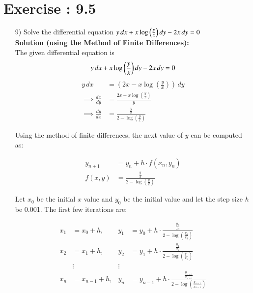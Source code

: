 \documentclass[journal]{IEEEtran}
\begin{document}
\section*{Exercise : 9.5}
\begin{enumerate}
\item [9)] Solve the differential equation $y \, dx + x \log{\ensuremath{\left(\frac{y}{x}\right)}} \, dy - 2x \, dy = 0$ \\
\textbf{Solution (using the Method of Finite Differences):}\\
The given differential equation is 
\begin{align}
    y \, dx + x \log{\ensuremath{\left(\frac{y}{x}\right)}} \, dy - 2x \, dy = 0
\end{align}
\begin{align}
y \, dx &= \left(2x - x \log\left(\frac{y}{x}\right)\right) \, dy \\
\implies \frac{dx}{dy} &= \frac{2x - x \log\left(\frac{y}{x}\right)}{y} \\
\implies \frac{dy}{dx} &= \frac{\frac{y}{x}}{2 - \log\left(\frac{y}{x}\right)} 
\end{align}

Using the method of finite differences, the next value of $y$ can be computed as:

\begin{align}
y_{n+1} &= y_n + h \cdot f(x_n, y_n) \\
f(x, y) &= \frac{\frac{y}{x}}{2 - \log\left(\frac{y}{x}\right)}
\end{align}

Let $x_0$ be the initial $x$ value and $y_0$ be the initial value and let the step size $h$ be 0.001. The first few iterations are:

\begin{align*}
x_1 &= x_0 + h, & y_1 &= y_0 + h \cdot \frac{\frac{y_0}{x_0}}{2 - \log\left(\frac{y_0}{x_0}\right)} \\
x_2 &= x_1 + h, & y_2 &= y_1 + h \cdot \frac{\frac{y_1}{x_1}}{2 - \log\left(\frac{y_1}{x_1}\right)} \\
&\vdots  & \vdots \\
x_n &= x_{n-1} + h, & y_n &= y_{n-1} + h \cdot \frac{\frac{y_{n-1}}{x_{n-1}}}{2 - \log\left(\frac{y_{n-1}}{x_{n-1}}\right)}
\end{align*}


\end{enumerate}
\end{document}
